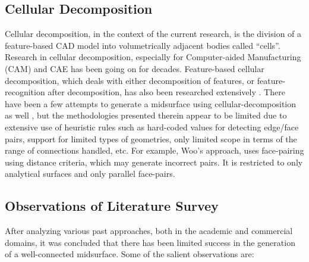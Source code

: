  \subsection{Cellular Decomposition}
 
Cellular decomposition, in the context of the current research, is the division of a feature-based CAD model into volumetrically adjacent bodies called ``cells''.  Research in  cellular decomposition, especially for Computer-aided Manufacturing (CAM) and CAE has been going on for decades. Feature-based cellular decomposition, which deals with either decomposition of features, or feature-recognition after decomposition,  has also been  researched extensively \cite{Bidarra1993,Woo2003, Boussuge2013}. There have been a few attempts to generate a midsurface using cellular-decomposition as well \cite{Chong2004, Woo2013, Boussuge2013, Zhu2015}, but the methodologies presented therein appear to be limited due to extensive use of heuristic rules such as hard-coded values for detecting edge/face pairs, support for limited types of geometries, only limited scope in terms of the range of connections  handled, etc. For example, Woo's \cite{Woo2013} approach, uses face-pairing using distance criteria, which may generate incorrect pairs. It is restricted to only analytical surfaces and only parallel face-pairs.%

\subsection{Observations of Literature Survey} \label{sec:litsurvey:analysis}
 
After analyzing various past approaches, both in the academic and commercial domains, it was concluded that there has been limited success in the generation of a well-connected midsurface. 
Some of the salient observations are:
 

